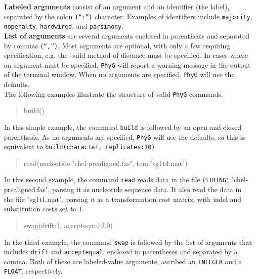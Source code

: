 \documentclass[11pt]{book}
\newcommand{\phyg}{\texttt{PhyG} }
\begin{document}
{{		\noindent \textbf{Labeled arguments} consist of an argument and an identifier 
		(the label), separated by the colon \texttt{(``:'')} character. Examples of 
		identifiers include \texttt{majority}, \texttt{nopenalty}, \texttt{hardwired}, and 
		\texttt{parsimony}. \\
		
		\noindent \textbf{List of arguments} are several arguments enclosed in parenthesis 
		and separated by commas \texttt{(``,'')}. Most arguments are optional, with only a 
		few requiring specification, e.g. the build method of distance must be specified. 
		In cases where an argument 
		must be specified, \phyg will report a warning message in the output of the 
		terminal window. When no arguments are specified, \phyg will use the defaults.\\
		
		\noindent The following examples illustrate the structure of valid \phyg commands. 
					
		\begin{quote}
		build()
		\end{quote}
		
		\noindent In this simple example, the command \texttt{build} is followed by an open 
		and closed parenthesis. As no arguments are specified, \phyg will use the defaults, 
		so this is equivalent to \texttt{build(character, replicates:10)}.	
			
		\begin{quote}
		read(nucleotide:"chel-prealigned.fas", tcm:"sg1t4.mat")
		\end{quote}		

		\noindent In this second example, the command \texttt{read} reads data in the file
		(\texttt{STRING}) "chel-prealigned.fas", parsing it as nucleotide sequence data. It also read the data 
		in the file "sg1t1.mat", parsing it as a transformation cost matrix, with indel and 
		substitution costs set to $1$.
		
		\begin{quote}
		swap(drift:3, acceptequal:2.0)
		\end{quote}
				
		\noindent In the third example, the command \texttt{swap} is followed by the list 
		of arguments that includes \texttt{drift} and \texttt{acceptequal}, enclosed in 
		parentheses and separated by a comma. Both of these are labeled-value arguments, 
		ascribed an \texttt{INTEGER} and a \texttt{FLOAT}, respectively.
		
}}
\end{document}
